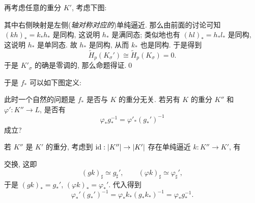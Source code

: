 \begin{Proof}
	再考虑任意的重分 $ K' $, 考虑下图:
	\begin{center}
	\end{center}
	其中右侧映射是左侧(\textit{轴对称对应的})单纯逼近. 那么由前面的讨论可知 $ (kh)_*=k_*h_* $ 是同构, 这说明 $ h_* $ 是满同态; 类似地也有 $ (hl)_*=h_*l_* $ 是同构, 这说明 $ h_* $ 是单同态. 故 $ h_* $ 是同构, 从而 $ k_* $ 也是同构. 于是得到
	\[
		\tilde{H}_p(K_\sigma')\cong\tilde{H}_p(K_\sigma)=0.
	\]
	于是 $ K'_\sigma $ 的确是零调的, 那么命题得证.\qed
\end{Proof}

于是 $ f_* $ 可以如下图定义:
\begin{center}
\end{center}
此时一个自然的问题是 $ f_* $ 是否与 $ K $ 的重分无关. 若另有 $ K $ 的重分 $ K'' $ 和 $ \varphi' : K''\to L $, 是否有
\[
	\varphi_*g_*^{-1}=\varphi'_*(g_*')^{-1}
\]
成立?

若 $ K'' $ 是 $ K' $ 的重分, 考虑到 $ \mathrm{id} : \left| K'' \right| \to\left| K' \right|  $ 存在单纯逼近 $ k : K''\to K' $, 有
\begin{center}
\end{center}
交换, 这即
\[
	(gk)_\sharp\simeq g_\sharp',\qquad (\varphi k)_\sharp\simeq\varphi_\sharp',
\]
于是 $ (gk)_*=g_*' $, $ (\varphi k)_*=\varphi_*' $. 代入得到
\[
	\varphi_*'(g_*')^{-1}=\varphi_*k_*(g_*k_*)^{-1}=\varphi_*g_*^{-1}.
\]

